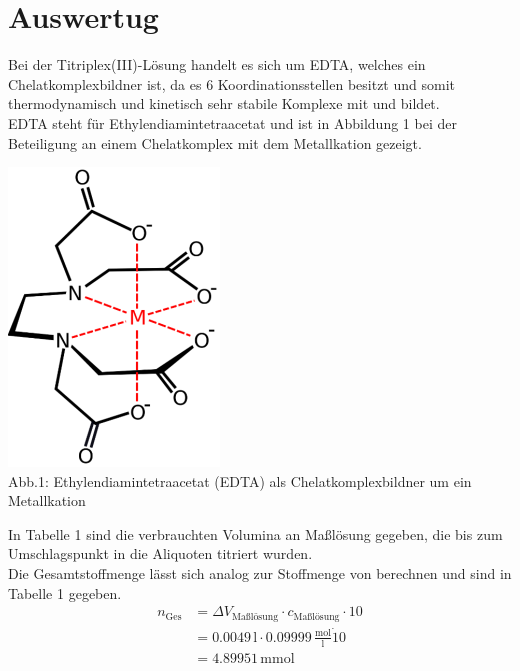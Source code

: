\documentclass[12pt]{scrartcl} %
\begin{document}
\section{Auswertug}
Bei der Titriplex(III)-Lösung handelt es sich um EDTA, welches ein Chelatkomplexbildner ist, da es 6 Koordinationsstellen besitzt und somit thermodynamisch und kinetisch sehr stabile Komplexe mit  und  bildet.\\
EDTA steht für Ethylendiamintetraacetat und ist in Abbildung 1 bei der Beteiligung an einem Chelatkomplex mit dem Metallkation  gezeigt.\\
\begin{center}
  \includegraphics{Abb/EDTA.png}\\
  Abb.1: Ethylendiamintetraacetat (EDTA) als Chelatkomplexbildner um ein Metallkation 
\end{center}

In Tabelle 1 sind die verbrauchten Volumina an Maßlösung gegeben, die bis zum Umschlagspunkt in die Aliquoten titriert wurden.\\
Die Gesamtstoffmenge lässt sich analog zur Stoffmenge von  berechnen und sind in Tabelle 1 gegeben.
\begin{align*}
  n_{\mathrm{Ges}} &= \Delta V_{\text{Maßlösung}} \cdot c_{\text{Maßlösung}} \cdot 10\\
  &= 0.0049\,\mathrm{l} \cdot 0.09999\,\mathrm{\frac{mol}{l}} \dot 10\\
  &= 4.89951\,\mathrm{mmol}
\end{align*}

\newpage
\end{document}
